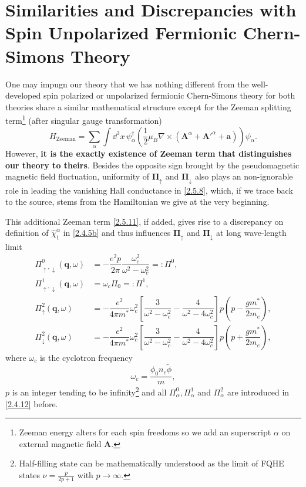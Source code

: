 \documentclass[bachelor,english,numbers]{ustcthesis}
\begin{document}
	\section{Similarities and Discrepancies with Spin Unpolarized Fermionic Chern-Simons Theory}
		\indent\par One may impugn our theory that we has nothing different from the well-developed spin polarized or unpolarized fermionic Chern-Simons theory \cite{mandal1996theory,modak2011fermionic} for both theories share a similar mathematical structure except for the Zeeman splitting term\footnote{Zeeman energy alters for each spin freedoms so we add an superscript $\alpha$ on external magnetic field $\bm{A}$.} (after singular gauge transformation)
		\begin{equation}\label{2.5.11}
			H_{\text{Zeeman}}=\sum_\alpha\int\dd^3x\,\psi^\dagger_\alpha\left(\dfrac{1}{2}\mu_B\nabla\times(\bm{A}^\alpha+\bm{A'}^\alpha+\bm{a})\right)\psi_\alpha.
		\end{equation}
		However, {\bf it is the exactly existence of Zeeman term that distinguishes our theory to theirs}. Besides the opposite sign brought by the pseudomagnetic magnetic field fluctuation, uniformity of $\bm{\Pi}_\uparrow$ and $\bm{\Pi}_\downarrow$ also plays an non-ignorable role in leading the vanishing Hall conductance in \eqref{2.5.8}, which, if we trace back to the source, stems from the Hamiltonian we give at the very beginning.\par
		This additional Zeeman term \eqref{2.5.11}, if added, gives rise to a discrepancy on definition of $\hat{\chi}_1^\alpha$ in \eqref{2.4.5b} and thus influences $\bm{\Pi}_\uparrow$ and $\bm{\Pi}_\downarrow$ at long wave-length limit \cite{mandal1996theory}
		\begin{subequations}
		\begin{align}
			\Pi^0_{\uparrow,\downarrow}(\bm{q},\omega)&=-\dfrac{e^2 p}{2\pi}\dfrac{\omega_c^2}{\omega^2-\omega_c^2}=:\Pi^0,\label{2.5.12a}\\
			\Pi^1_{\uparrow,\downarrow}(\bm{q},\omega)&=\omega_c\Pi_0=:\Pi^1,\label{2.5.12b}\\
			\Pi^2_{\uparrow}(\bm{q},\omega)&=-\dfrac{e^2}{4\pi m^*}\omega_c^2\left[\dfrac{3}{\omega^2-\omega_c^2}-\dfrac{4}{\omega^2-4\omega_c^2}\right]p\left(p-\dfrac{gm^*}{2m_e}\right),\label{2.5.12d}\\
			\Pi^2_{\downarrow}(\bm{q},\omega)&=-\dfrac{e^2}{4\pi m^*}\omega_c^2\left[\dfrac{3}{\omega^2-\omega_c^2}-\dfrac{4}{\omega^2-4\omega_c^2}\right]p\left(p+\dfrac{gm^*}{2m_e}\right),\label{2.5.12e}
		\end{align}
		\end{subequations}
		where $\omega_c$ is the cyclotron frequency
		\begin{equation}\label{2.5.13}
			\omega_c=\dfrac{\phi_0 n_e \widetilde{\phi} }{m},
		\end{equation}
		$p$ is an integer tending to be infinity\footnote{Half-filling state can be mathematically understood as the limit of FQHE states $\nu=\frac{p}{2p+1}$ with $p\rightarrow\infty$.} and all $\Pi^0_\alpha, \Pi^1_\alpha$ and $\Pi^2_\alpha$ are introduced in \eqref{2.4.12} before.\par
\end{document}
